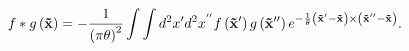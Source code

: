 \begin{equation}
f\ast g\left( \mathbf{\vec{x}}\right) =-\frac{1}{\left( \pi \theta \right)
^{2}}\int \int d^{2}x^{\prime }d^{2}x^{^{\prime \prime }}f\left( \mathbf{%
\vec{x}}^{\prime }\right) g\left( \mathbf{\vec{x}}^{\prime \prime }\right)
e^{-\frac{1}{\theta } \left( \mathbf{\vec{x}}^{\prime }-\mathbf{\vec{x}}%
\right) \times \left( \mathbf{\vec{x}}^{\prime \prime }-\mathbf{\vec{x}}%
\right) }.  \label{Bakerform}
\end{equation}

